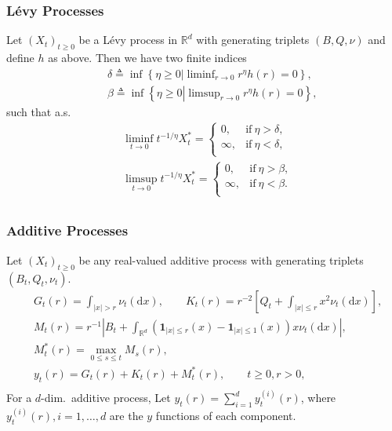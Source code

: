\documentclass[12pt]{beamer}
\def\RR{\mathbb{R}}
\def\d{\mathrm{d}}
\def\ind{\mathbf{1}}
\begin{document}
\begin{frame}
	\frametitle{L\'evy Processes}
	\begin{theorem}
		Let $(X_t)_{t\ge 0}$ be a L\'evy process in $\RR^d$ with generating triplets $(B,Q,\nu)$ and define $h$ as above. Then we have two finite indices
		\begin{eqnarray*}
			& & \delta \triangleq \inf\left\{ \eta\ge0\left|\liminf\nolimits_{r\to0}r^\eta h(r)=0\right. \right\},\\[1ex]
			& & \beta \triangleq \inf\left\{ \eta\ge0\left|\limsup\nolimits_{r\to0}r^\eta h(r)=0\right. \right\},
		\end{eqnarray*}
		such that a.s.
		\vspace{-2ex}
		\begin{equation*}
			\begin{split}
				& \liminf_{t\to0}t^{-1/\eta}X_t^*= 
				\begin{cases}
					0, & \mathrm{if\ } \eta>\delta, \\
					\infty, & \mathrm{if\ } \eta<\delta, \\
				\end{cases} \\
				& \limsup_{t\to0}t^{-1/\eta}X_t^*= 
				\begin{cases}
					0, & \mathrm{if\ } \eta>\beta, \\
					\infty, & \mathrm{if\ } \eta<\beta. \\
				\end{cases} \\
			\end{split}
		\end{equation*}
	\end{theorem}
\end{frame}
\begin{frame}
	\frametitle{Additive Processes}
	Let $(X_t)_{t\ge 0}$ be any real-valued additive process with generating triplets $(B_t,Q_t,\nu_t)$.
	\pause
	\begin{equation*}
		\begin{split}
			& G_t(r)=\int_{|x|>r}\nu_t(\d x),\qquad K_t(r)=r^{-2}\left[Q_t +\int_{|x|\le r}x^2\nu_t(\d x) \right],\\[1ex]
			& M_t(r)=r^{-1}\left| B_t+\int_{\RR^d}\left(\ind_{|x|\le r}(x)-\ind_{|x|\le 1}(x)\right)x\nu_t(\d x) \right|,\\[1ex]
			& M_t^*(r)=\max_{0\le s\le t} M_s(r),\\[1ex]
			& y_t(r)=G_t(r)+K_t(r)+M_t^*(r),\qquad t\ge0,r>0,\\
		\end{split}
	\end{equation*}
	\pause
	For a $d$-dim.~additive process, Let $y_t(r)=\sum_{i=1}^d y_t^{(i)}(r)$, where $y_t^{(i)}(r), i=1,\ldots,d$ are the $y$ functions of each component.
\end{frame}
\end{document}
